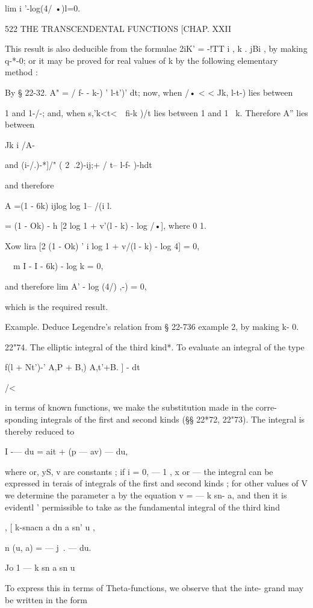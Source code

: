 lim i '-log(4/ •)l=0.

522 THE TRANSCENDENTAL FUNCTIONS [CHAP. XXII

This result is also deducible from the formulae 2iK' = -!TT i , k .
jBi , by making q-*-0; or it may be proved for real values of k by the
following elementary method :

By § 22-32. A" = / f- - k-) ' l-t')' dt; now, when /• < < Jk, l-t-)
lies between

1 and 1-/-; and, when s,'k<t<\ \ fi-k )/t lies between 1 and 1 ~k.
Therefore A'' lies between

Jk i /A-

and (i-/.)-*]/" ( 2\ .2)-ij;+ / t-- l-f- )-hdt\;

and therefore

A =(1 - 6k) ijlog log 1-- /(i l.

= (1 - Ok) - h [2 log 1 + v'(l - k) - log /•], where 0 1.

Xow lira [2 (1 - Ok) ' i log 1 + v/(l - k) - log 4] = 0,

\ \ m I - I - 6k) - log k = 0,

and therefore lim A' - log (4/) ,-) = 0,

which is the required result.

Example. Deduce Legendre's relation from § 22-736 example 2, by making
k- 0.

22"74. The elliptic integral of the third kind*. To evaluate an
integral of the type

f(l + Nt')-' A,P + B,) A,t'+B. ] - dt

/<

in terms of known functions, we make the substitution made in the
corre- sponding integrals of the first and second kinds (§§ 22*72,
22"73). The integral is thereby reduced to

I -— du = ait + (p — av) — du,

where or, yS, v are constants ; if i = 0, — 1 , x or — the integral
can be expressed in terais of integrals of the first and second kinds
; for other values of V we determine the parameter a by the equation v
= — k sn- a, and then it is evidentl ' permissible to take as the
fundamental integral of the third kind

  , [ k-snacn a dn a sn' u ,

n (u, a) = — j~. — du.

  Jo 1 — k sn a sn u

To express this in terms of Theta-functions, we observe that the inte-
grand may be written in the form

